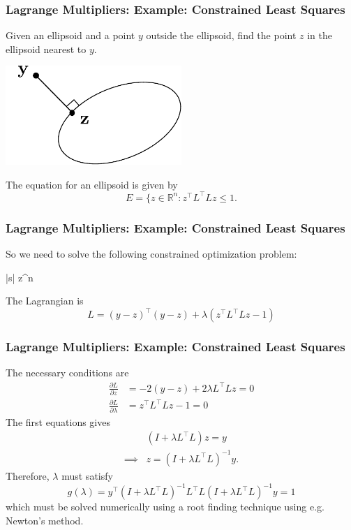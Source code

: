 \documentclass{beamer}
\begin{document}
\begin{frame}\frametitle{Lagrange Multipliers: Example: Constrained Least Squares}
	Given an ellipsoid and a point $y$ outside the ellipsoid, find the point $z$ in the ellipsoid nearest to $y$.\\
	\begin{center}
		\includegraphics[width=0.5\textwidth]
			{figures/chap18_closest_point_to_set}
	\end{center}
	The equation for an ellipsoid is given by
	\[ 
		E = \{ z\in \mathbb{R}^n : z^\top L^\top Lz \leq 1.
	\]	
\end{frame}

\begin{frame}\frametitle{Lagrange Multipliers: Example: Constrained Least Squares}
	So we need to solve the following constrained optimization problem:
	\begin{mini*}|s|
		{z\in{}^n}{}{}{}
	\end{mini*}
	The Lagrangian is
	\[ 
		L = (y - z)^\top (y - z) + \lambda(z^\top L^\top Lz - 1) 
	\]
	
\end{frame}

\begin{frame}\frametitle{Lagrange Multipliers: Example: Constrained Least Squares}
	The necessary conditions are
	\begin{align*}
		\frac{\partial L}{\partial z} &= -2(y - z) + 2\lambda L^\top Lz = 0 \\
		\frac{\partial L}{\partial \lambda} &= z^\top L^\top Lz - 1 = 0
	\end{align*}
	The first equations gives
	\begin{align*}
		& (I + \lambda L^\top L)z = y \\
		\implies & z = (I + \lambda L^\top L)^{-1}y.
	\end{align*}
	Therefore, $\lambda$ must satisfy
	\[ 
		g(\lambda) = y^\top (I+\lambda L^\top L)^{-1}L^\top L(I + \lambda L^\top L)^{-1}y = 1 
	\]
	which must be solved numerically using a  root finding technique using e.g. Newton's method.	
\end{frame}
\end{document}
